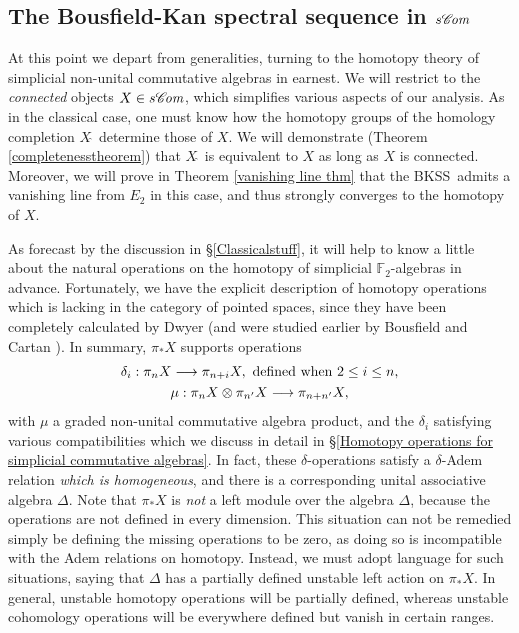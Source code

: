 \documentclass[11pt]{amsart} \renewcommand{\baselinestretch}{1.2}
\theoremstyle{plain}
\numberwithin{equation}{section} %
\theoremstyle{plain}
\numberwithin{equation}{chapter} %
\renewcommand{\to}{\longrightarrow}
\newcommand{\scrC}{\mathscr{C}}
\newcommand{\calX}{\mathcal{X}}
\newcommand{\calc}{\mathcal{C}}
\newcommand{\F}{\mathbb{F}}
\newcommand{\algs}{{\scrC\!\textit{\normalfont\textit{om}}}}
\newcommand{\Ftwo}{\F_2}
\newcommand{\E}[5]{[E^{#1}_{#2}#3]^{#4}_{#5}}
\newcommand{\BKSS}{BKSS}
\newcommand{\SubsectionOrSection}[1]{\subsection{#1}}
\begin{document}
\begin{Introduction}
\SubsectionOrSection{The Bousfield-Kan spectral sequence in $s\algs$}
\label{The BKSS intro spiel}
At this point we depart from generalities, turning to the homotopy theory of simplicial non-unital commutative algebras in earnest.
We will restrict to the \emph{connected} objects $X\in s\algs$, which simplifies various aspects of our analysis.
As in the classical case, one must know how the homotopy groups of the homology completion $X\hat{\ }$ determine those of $X$. We will demonstrate (Theorem \ref{completenesstheorem}) that $X\hat{\ }$ is equivalent to $X$ as long as $X$ is connected. Moreover, we will prove in Theorem \ref{vanishing line thm} that the \BKSS\ admits a vanishing line from $E_2 $ in this case, and thus strongly converges to the homotopy of $X$.

As forecast by the discussion in \S\ref{Classicalstuff}, it will help to know a little about the natural operations on the homotopy of simplicial $\Ftwo$-algebras in advance. Fortunately, we have 
the explicit description of homotopy operations which is lacking in the category of pointed spaces, since they have been completely calculated by Dwyer \cite{DwyerHtpyOpsSimpComAlg.pdf} (and were studied earlier by Bousfield \cite{BousOpnsDerFun.pdf,BousHomogFunctors.pdf} and Cartan \cite{CartanDivSquares}). In summary, $\pi_*X$ supports operations
\begin{gather*}
\delta_i:\pi_nX\to \pi_{n+i}X,\textup{ defined when }2\leq i\leq n,\\
\mu:\pi_nX\otimes \pi_{n'}X\to \pi_{n+n'}X,
\end{gather*}
with $\mu$ a graded non-unital commutative algebra product, and %
the $\delta_i$ satisfying various compatibilities which we discuss in detail in \S\ref{Homotopy operations for simplicial commutative algebras}. In fact, these $\delta$-operations satisfy a $\delta$-Adem relation \emph{which is homogeneous}, and there is a corresponding unital associative algebra $\Delta$. Note that $\pi_*X$ is \emph{not} a left module over the algebra $\Delta$, because the operations are not defined in every dimension. This situation can not be remedied simply be defining the missing operations to be zero, as doing so is incompatible with the Adem relations on homotopy. Instead, we must adopt language for such situations, saying that $\Delta$ has a partially defined unstable left action on $\pi_*X$. In general, unstable homotopy operations will be  partially defined, whereas unstable cohomology operations will be everywhere defined but vanish in certain ranges.


\end{Introduction}
\end{document}
